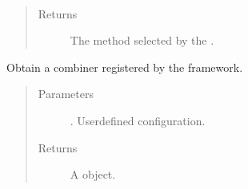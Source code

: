 \documentclass[letterpaper,10pt,english]{sphinxmanual}
\begin{document}
\begin{fulllineitems}
\begin{fulllineitems}
\begin{quote}
\begin{description}
\end{description}\end{quote}

\end{fulllineitems}


\begin{fulllineitems}
\label{\detokenize{pusion.auto.auto_combiner:pusion.auto.auto_combiner.AutoCombiner.get_selected_combiner}}~\begin{quote}\begin{description}
\item[{Returns}] \leavevmode
\sphinxAtStartPar
The method selected by the .

\end{description}\end{quote}

\end{fulllineitems}


\begin{fulllineitems}
\label{\detokenize{pusion.auto.auto_combiner:pusion.auto.auto_combiner.AutoCombiner.obtain}}
\sphinxAtStartPar
Obtain a combiner registered by the framework.
\begin{quote}\begin{description}
\item[{Parameters}] \leavevmode
\sphinxAtStartPar
{} \textendash{} {\hyperref[\detokenize{pusion.model.configuration:pusion.model.configuration.Configuration}]{}}. User\sphinxhyphen{}defined configuration.

\item[{Returns}] \leavevmode
\sphinxAtStartPar
A  object.

\end{description}\end{quote}


\end{fulllineitems}
\end{fulllineitems}
\end{document}

